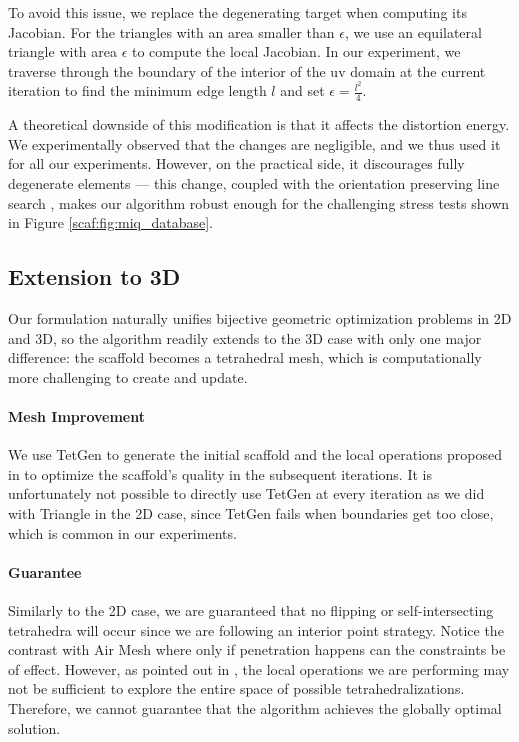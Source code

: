 To avoid this issue, we replace the degenerating target {when computing its} Jacobian. For the triangles with an area smaller th{an $\epsilon$, we use an equilateral triangle with area $\epsilon$ to compute the local Jacobian.} {In our experiment,} we traverse through the boundary of the interior of the uv domain at the current iteration to find the minimum edge length $l$ {and set} $\epsilon = \frac{l^2}{4}$.

A theoretical downside of this modification {is that} it affects the distortion energy. We experimentally observed that the changes are negligible, and we thus used it for all our experiments. {However, on the practical side}, it discourages fully degenerate elements --- this change, coupled with the orientation preserving line search \cite{Smith:2015}, makes our algorithm robust {enough for the challenging stress tests shown in} Figure \ref{scaf:fig:miq_database}.

\subsection{Extension to 3D}

{Our formulation naturally unifies bijective geometric optimization problems in 2D and 3D, so the} algorithm readily extends to the 3D case with only one major difference: the scaffold becomes a tetrahedral mesh, which is computationally more challenging to create and update.
\paragraph{{Mesh Improvement}}
We use TetGen \cite{tetgen} to generate the initial scaffold and the local operations proposed in \cite{Klingner:2009} to optimize the scaffold's quality in the subsequent iterations. 
%
It is unfortunately not possible to directly use TetGen at every iteration as we did with Triangle in the 2D case, since TetGen fails when boundaries get too close, which is common in our experiments.

\paragraph{Guarantee} Similarly to the 2D case, we are guaranteed that no flipping or self-intersecting tetrahedra will occur since we are following an interior point strategy. Notice the contrast with Air Mesh \cite{Muller:2015} where only if penetration happens can the constraints be of effect. However, as pointed out in \cite{Dougherty2004}, the local operations we are performing may not be sufficient to explore the entire space of possible tetrahedralizations. %
Therefore, we cannot guarantee that the algorithm achieves the globally optimal solution.
